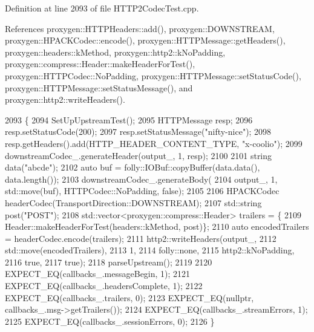 Definition at line 2093 of file H\+T\+T\+P2\+Codec\+Test.\+cpp.



References proxygen\+::\+H\+T\+T\+P\+Headers\+::add(), proxygen\+::\+D\+O\+W\+N\+S\+T\+R\+E\+AM, proxygen\+::\+H\+P\+A\+C\+K\+Codec\+::encode(), proxygen\+::\+H\+T\+T\+P\+Message\+::get\+Headers(), proxygen\+::headers\+::k\+Method, proxygen\+::http2\+::k\+No\+Padding, proxygen\+::compress\+::\+Header\+::make\+Header\+For\+Test(), proxygen\+::\+H\+T\+T\+P\+Codec\+::\+No\+Padding, proxygen\+::\+H\+T\+T\+P\+Message\+::set\+Status\+Code(), proxygen\+::\+H\+T\+T\+P\+Message\+::set\+Status\+Message(), and proxygen\+::http2\+::write\+Headers().


\begin{DoxyCode}
2093                                                        \{
2094   SetUpUpstreamTest();
2095   HTTPMessage resp;
2096   resp.setStatusCode(200);
2097   resp.setStatusMessage(\textcolor{stringliteral}{"nifty-nice"});
2098   resp.getHeaders().add(HTTP\_HEADER\_CONTENT\_TYPE, \textcolor{stringliteral}{"x-coolio"});
2099   downstreamCodec\_.generateHeader(output\_, 1, resp);
2100 
2101   \textcolor{keywordtype}{string} data(\textcolor{stringliteral}{"abcde"});
2102   \textcolor{keyword}{auto} buf = folly::IOBuf::copyBuffer(data.data(), data.length());
2103   downstreamCodec\_.generateBody(
2104       output\_, 1, std::move(buf), HTTPCodec::NoPadding, \textcolor{keyword}{false});
2105 
2106   HPACKCodec headerCodec(TransportDirection::DOWNSTREAM);
2107   std::string post(\textcolor{stringliteral}{"POST"});
2108   std::vector<proxygen::compress::Header> trailers = \{
2109       Header::makeHeaderForTest(headers::kMethod, post)\};
2110   \textcolor{keyword}{auto} encodedTrailers = headerCodec.encode(trailers);
2111   http2::writeHeaders(output\_,
2112                       std::move(encodedTrailers),
2113                       1,
2114                       folly::none,
2115                       http2::kNoPadding,
2116                       \textcolor{keyword}{true},
2117                       \textcolor{keyword}{true});
2118   parseUpstream();
2119 
2120   EXPECT\_EQ(callbacks\_.messageBegin, 1);
2121   EXPECT\_EQ(callbacks\_.headersComplete, 1);
2122   EXPECT\_EQ(callbacks\_.trailers, 0);
2123   EXPECT\_EQ(\textcolor{keyword}{nullptr}, callbacks\_.msg->getTrailers());
2124   EXPECT\_EQ(callbacks\_.streamErrors, 1);
2125   EXPECT\_EQ(callbacks\_.sessionErrors, 0);
2126 \}
\end{DoxyCode}
